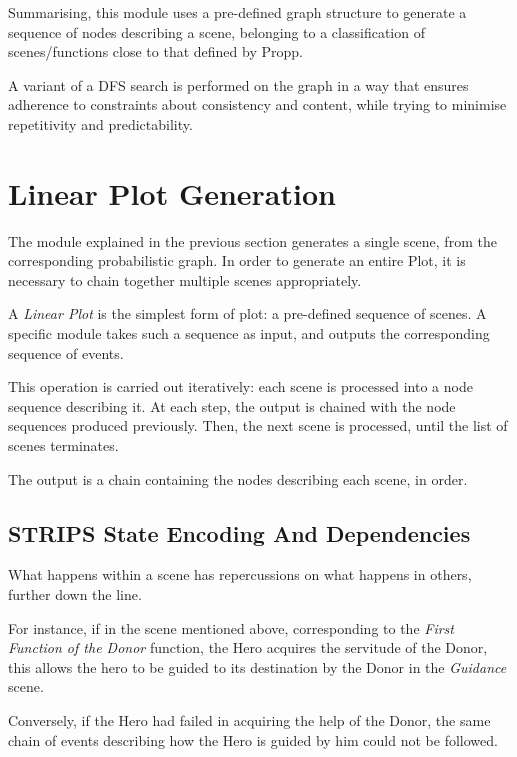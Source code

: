 \documentclass[12pt,a4paper,oneside]{report}
\begin{document}
\bigskip

Summarising, this module uses a pre-defined graph structure to generate a sequence of nodes describing a scene, belonging to a classification of scenes/functions close to that defined by Propp. 

A variant of a DFS search is performed on the graph in a way that ensures adherence to constraints about consistency and content, while trying to minimise repetitivity and predictability.

\pagebreak

\section{Linear Plot Generation}
The module explained in the previous section generates a single scene, from the corresponding probabilistic graph. In order to generate an entire Plot, it is necessary to chain together multiple scenes appropriately.

\bigskip

A \textit{Linear Plot} is the simplest form of plot: a pre-defined sequence of scenes. A specific module takes such a sequence as input, and outputs the corresponding sequence of events.

This operation is carried out iteratively: each scene is processed into a node sequence describing it. At each step, the output is chained with the node sequences produced previously. Then, the next scene is processed, until the list of scenes terminates.

The output is a chain containing the nodes describing each scene, in order.

\subsection{STRIPS State Encoding And Dependencies}
What happens within a scene has repercussions on what happens in others, further down the line. 

For instance, if in the scene mentioned above, corresponding to the \textit{First Function of the Donor} function, the Hero acquires the servitude of the Donor, this allows the hero to be guided to its destination by the Donor in the \textit{Guidance} scene. 

Conversely, if the Hero had failed in acquiring the help of the Donor, the same chain of events describing how the Hero is guided by him could not be followed.

\bigskip
\end{document}
